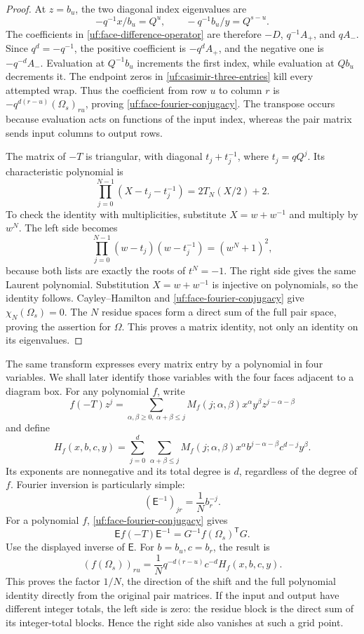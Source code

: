\documentclass[11pt]{article}
\numberwithin{equation}{section}
\theoremstyle{definition}\newtheorem{definition}[theorem]{Definition}
\theoremstyle{remark}\newtheorem{remark}[theorem]{Remark}
\begin{document}
\begin{proof}
At \(z=b_u\), the two diagonal index eigenvalues are
\[
 -q^{-1}x/b_u=Q^u,\qquad
 -q^{-1}b_u/y=Q^{s-u}.
\]
The coefficients in \eqref{uf:face-difference-operator} are therefore
\(-D\), \(q^{-1}A_+\), and \(qA_-\). Since
\(q^d=-q^{-1}\), the positive coefficient is
\(-q^dA_+\), and the negative one is \(-q^{-d}A_-\).
Evaluation at \(Q^{-1}b_u\) increments the first index, while
evaluation at \(Qb_u\) decrements it. The endpoint zeros in
\eqref{uf:casimir-three-entries} kill every attempted wrap.
Thus the coefficient from row \(u\) to column \(r\) is
\(-q^{d(r-u)}(\Omega_s)_{ru}\), proving
\eqref{uf:face-fourier-conjugacy}. The transpose occurs because
evaluation acts on functions of the input index, whereas the pair
matrix sends input columns to output rows.

The matrix of \(-T\) is triangular, with diagonal
\(t_j+t_j^{-1}\), where \(t_j=qQ^j\). Its characteristic
polynomial is
\[
 \prod_{j=0}^{N-1}(X-t_j-t_j^{-1})=2T_N(X/2)+2.
\]
To check the identity with multiplicities, substitute \(X=w+w^{-1}\)
and multiply by \(w^N\). The left side becomes
\[
 \prod_{j=0}^{N-1}(w-t_j)(w-t_j^{-1})=(w^N+1)^2,
\]
because both lists are exactly the roots of \(t^N=-1\).
The right side gives the same Laurent polynomial. Substitution
\(X=w+w^{-1}\) is injective on polynomials, so the identity follows.
Cayley--Hamilton and \eqref{uf:face-fourier-conjugacy} give
\(\chi_N(\Omega_s)=0\). The \(N\) residue spaces form a direct sum
of the full pair space, proving the assertion for \(\Omega\).
This proves a matrix identity, not only an identity on its eigenvalues.
\end{proof}

The same transform expresses every matrix entry by a polynomial in
four variables. We shall later identify those variables with the
four faces adjacent to a diagram box.
For any polynomial \(f\), write
\[
 f(-T)z^j=\sum_{\alpha,\beta\ge0,\ \alpha+\beta\le j}
  M_f(j;\alpha,\beta)x^\alpha y^\beta z^{j-\alpha-\beta}
\]
and define
\begin{equation}\label{uf:homogeneous-local-adapter}
 H_f(x,b,c,y)=\sum_{j=0}^{d}\,
 \sum_{\alpha+\beta\le j}
 M_f(j;\alpha,\beta)
 x^\alpha b^{j-\alpha-\beta}c^{d-j}y^\beta.
\end{equation}
Its exponents are nonnegative and its total degree is \(d\),
regardless of the degree of \(f\). Fourier inversion is particularly
simple:
\[
 (\mathsf E^{-1})_{jr}=\frac1N b_r^{-j}.
\]
For a polynomial \(f\), \eqref{uf:face-fourier-conjugacy} gives
\[
 \mathsf E f(-T)\mathsf E^{-1}
                  =G^{-1}f(\Omega_s)^{\mathsf T}G.
\]
Use the displayed inverse of \(\mathsf E\). For \(b=b_u,c=b_r\),
the result is
\begin{equation}\label{uf:physical-local-adapter}
 (f(\Omega_s))_{ru}
   =\frac1N q^{-d(r-u)}c^{-d}H_f(x,b,c,y).
\end{equation}
This proves the factor \(1/N\), the direction of the shift and the
full polynomial identity directly from the original pair matrices.
If the input and output have different integer totals, the left
side is zero: the residue block is the direct sum of its integer-total
blocks. Hence the right side also vanishes at such a grid point.
\end{document}
